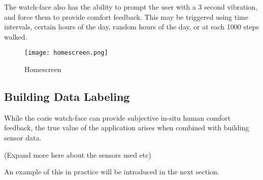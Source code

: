 The watch-face also has the ability to prompt the user with a 3 second vibration, and force them to provide comfort feedback. This may be triggered using time intervals, certain hours of the day, random hours of the day, or at each 1000 steps walked. 


\begin{figure}
\begin{center}
\texttt{[image: homescreen.png]}
\caption{Homescreen}
\label{fig:homescreen}
\end{center}
\end{figure}

\subsection{Building Data Labeling}

While the cozie watch-face can provide subjective in-situ human comfort feedback, the true value of the application arises when combined with building sensor data. 

(Expand more here about the sensors used etc)

An example of this in practice will be introduced in the next section.